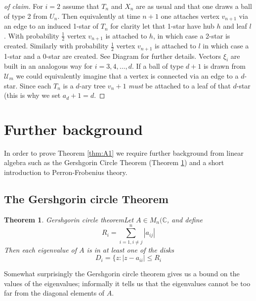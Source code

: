\documentclass[oneside]{book} %
\newtheorem{thm}{Theorem}[section]
\theoremstyle{definition}
\numberwithin{equation}{section}
\begin{document}
\begin{proof}[of claim]
 For $i = 2$ assume that $T_n$ and $X_n$ are as usual and that one draws a ball of type 2 from $U_n$.  Then equivalently at time $n+1$ one attaches vertex $v_{n+1}$ via an edge to an induced 1-star of $T_n$ for clarity let that 1-star have hub $h$ and leaf $l$.  With probability $\frac{1}{2}$ vertex $v_{n+1}$ is attached to $h$, in which case a 2-star is created.  Similarly with probability $\frac{1}{2}$ vertex $v_{n+1}$ is attached to $l$ in which case a 1-star and a 0-star are created.  See Diagram %
 for further details.  Vectors $\xi_i$ are built in an analogous way for $i = 3,4,\dots,d$.  If a ball of type $d+1$ is drawn from $\mathcal{U}_m$ we could equivalently imagine that a vertex is connected via an edge to a $d$-star.  Since each $T_n$ is a $d$-ary tree $v_n+1$ \emph{must} be attached to a leaf of that $d$-star (this is why we set $a_d+1 = d$.  
 \end{proof} 




\section{Further background}

In order to prove Theorem \ref{thm:A1} we require further background from linear algebra such as the Gershgorin Circle Theorem (Theorem \ref{thm:gct}) and a short introduction to Perron-Frobenius theory.

\subsection{The Gershgorin circle Theorem}

\begin{thm}{Gershgorin circle theorem}\label{thm:gct}
 Let $A \in M_n(\mathbb{C}$, and define 
 \[R_i = \sum_{i = 1, i \neq j}^n |a_{ij}|\]
 Then each eigenvalue of $A$ is in at least one of the disks 
\[D_{i} = \{z : | z-a_{ii}| \leq R_{i}\]
\end{thm}
Somewhat surprisingly the Gershgorin circle theorem gives us a bound on the values of the eigenvalues; informally it tells us that the eigenvalues cannot be too far from the diagonal elements of $A$. 
\end{document}
